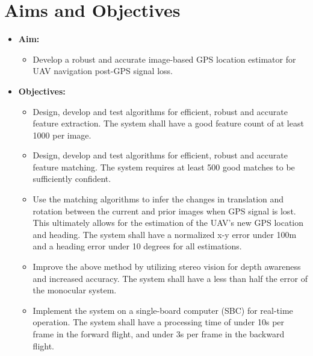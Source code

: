 \section{Aims and Objectives}
\begin{itemize}
    \item \textbf{Aim:}
    \begin{itemize}
        \item Develop a robust and accurate image-based GPS location estimator for UAV navigation post-GPS signal loss. 
    \end{itemize}
    \item \textbf{Objectives:}
    \begin{itemize}
        \item Design, develop and test algorithms for efficient, robust and accurate feature extraction. The system shall have a good feature count of at least 1000 per image.
        \item Design, develop and test algorithms for efficient, robust and accurate feature matching. The system requires at least 500 good matches to be sufficiently confident. 
        \item Use the matching algorithms to infer the changes in translation and rotation between the current and prior images when GPS signal is lost. This ultimately allows for the estimation of the UAV's new GPS location and heading. The system shall have a normalized x-y error under 100m and a heading error under 10 degrees for all estimations.
        \item Improve the above method by utilizing stereo vision for depth awareness and increased accuracy. The system shall have a less than half the error of the monocular system.
        \item Implement the system on a single-board computer (SBC) for real-time operation. The system shall have a processing time of under 10s per frame in the forward flight, and under 3s per frame in the backward flight.
    \end{itemize}
\end{itemize}

